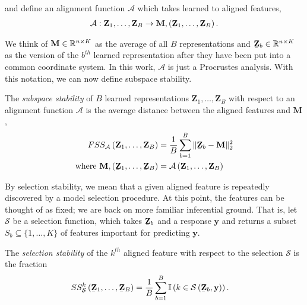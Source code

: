 and define an alignment function $\mathcal{A}$ which takes learned to aligned
features,
\begin{align*}
\mathcal{A}: \mathbf{Z}_{1}, \dots, \mathbf{Z}_{B} \to \mathbf{M}, \left(\underaccent{\bar}{\mathbf{Z}}_{1}, \dots, \underaccent{\bar}{\mathbf{Z}}_{B}\right).
\end{align*}

We think of $\mathbf{M} \in \mathbb{R}^{n \times K}$ as the average of all $B$
representations and $\underaccent{\bar}{\mathbf{Z}}_{b} \in \reals^{n \times K}$
as the version of the $b^{th}$ learned representation after they have been put
into a common coordinate system. In this work, $\mathcal{A}$ is just a
Procrustes analysis. With this notation, we can now define subspace stability.
\begin{definition}
The \textit{subspace stability} of $B$ learned representations $\mathbf{Z}_{1},
\dots, \mathbf{Z}_{B}$ with respect to an alignment function $\mathcal{A}$ is
the average distance between the aligned features and $\mathbf{M}$,
\begin{align*}
FSS_{\mathcal{A}}\left(\mathbf{Z}_{1}, \dots, \mathbf{Z}_{B}\right) &= \frac{1}{B} \sum_{b = 1}^{B} \|\underaccent{\bar}{\mathbf{Z}}_{b} - \mathbf{M}\|^{2}_{2} \\
\text{where } \mathbf{M}, \left(\underaccent{\bar}{\mathbf{Z}}_{1}, \dots, \underaccent{\bar}{\mathbf{Z}}_{B}\right) &= \mathcal{A}\left(\mathbf{Z}_{1}, \dots, \mathbf{Z}_{B}\right)
\end{align*}
\end{definition}

By selection stability, we mean that a given aligned feature is repeatedly
discovered by a model selection procedure. At this point, the features can be
thought of as fixed; we are back on more familiar inferential ground. That is,
let $\mathcal{S}$ be a selection function, which takes
$\underaccent{\bar}{\mathbf{Z}}_{b}$ and a response $\mathbf{y}$ and returns a
subset $S_{b} \subseteq \{1, \dots, K\}$ of features important for predicting
$\mathbf{y}$.

\begin{definition}
The \textit{selection stability} of the $k^{th}$ aligned feature with respect to
the selection $\mathcal{S}$ is the
fraction
\begin{align*}
SS_{\mathcal{S}}^{k}\left(\underaccent{\bar}{\mathbf{Z}}_{1}, \dots, \underaccent{\bar}{\mathbf{Z}}_{B}\right) &= \frac{1}{B}\sum_{b = 1}^{B} \indic{k \in \mathcal{S}\left(\underaccent{\bar}{\mathbf{Z}}_{b}, \mathbf{y}\right)}.
\end{align*}
\end{definition}
